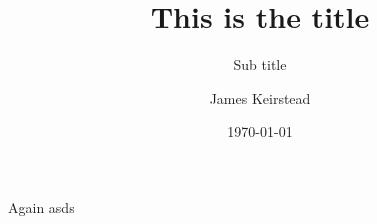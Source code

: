 \documentclass{beamer}
\title{This is the title}
\subtitle{Sub title}
\date{\today}
\author{James Keirstead}
\begin{document}
\begin{frame}
\maketitle
\end{frame}
\begin{frame}{Again}
asds
\end{frame}
\end{document}
